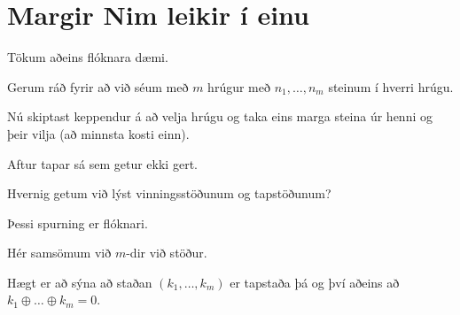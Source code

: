 \section{Margir Nim leikir í einu}
{
    {
        \item<1-> Tökum aðeins flóknara dæmi.
        \item<2-> Gerum ráð fyrir að við séum með $m$ hrúgur með $n_1, \dots, n_m$ steinum í hverri hrúgu.
        \item<3-> Nú skiptast keppendur á að velja hrúgu og taka eins marga steina úr henni og þeir vilja (að minnsta kosti einn).
        \item<4-> Aftur tapar sá sem getur ekki gert.
        \item<5-> Hvernig getum við lýst vinningsstöðunum og tapstöðunum?
        \item<6-> Þessi spurning er flóknari.
        \item<7-> Hér samsömum við $m$-dir við stöður.
        \item<8-> Hægt er að sýna að staðan $(k_1, \dots, k_m)$ er tapstaða þá og því aðeins að $k_1 \oplus \dots \oplus k_m = 0$.
    }
}


